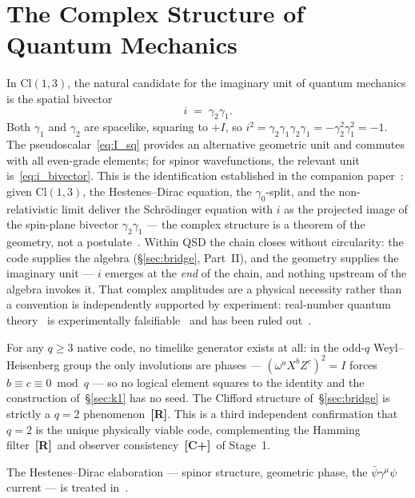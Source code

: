 \documentclass[11pt,a4paper]{article}
\newcommand{\Rmark}{\textcolor{green!50!black}{\textbf{[R]}}}
\newcommand{\Cpmark}{\textcolor{blue!70!black}{\textbf{[C+]}}}
\providecommand{\Cl}[1]{\mathrm{Cl}(#1)}
\begin{document}
\section{The Complex Structure of Quantum Mechanics}
\label{sec:complex}

In $\Cl{1,3}$, the natural candidate for the imaginary unit of quantum mechanics is the spatial bivector
\begin{equation}
  i \;=\; \gamma_2\gamma_1.
  \label{eq:i_bivector}
\end{equation}
Both $\gamma_1$ and $\gamma_2$ are spacelike, squaring to $+I$, so
\(
  i^2 = \gamma_2\gamma_1\gamma_2\gamma_1
       = -\gamma_2^2\gamma_1^2 = -1.
\)
The pseudoscalar~\eqref{eq:I_sq} provides an alternative geometric unit and commutes with all even-grade elements; for spinor wavefunctions, the relevant unit is~\eqref{eq:i_bivector}. This is the identification established in the companion paper~\cite{Hubka2026CW}: given $\Cl{1,3}$, the Hestenes--Dirac equation, the $\gamma_0$-split, and the non-relativistic limit deliver the Schr\"odinger equation with $i$ as the projected image of the spin-plane bivector $\gamma_2\gamma_1$ --- the complex structure is a theorem of the geometry, not a postulate~\cite{Hestenes2003, Hubka2026CW}. Within QSD the chain closes without circularity: the code supplies the algebra (\S\ref{sec:bridge}, Part~II), and the geometry supplies the imaginary unit --- $i$ emerges at the \emph{end} of the chain, and nothing upstream of the algebra invokes it. That complex amplitudes are a physical necessity rather than a convention is independently supported by experiment: real-number quantum theory~\cite{Stueckelberg1960} is experimentally falsifiable~\cite{Renou2021} and has been ruled out~\cite{Chen2022}.

For any $q\geq3$ native code, no timelike generator exists at all: in the odd-$q$ Weyl--Heisenberg group the only involutions are phases --- $(\omega^a X^b Z^c)^2 = I$ forces $b\equiv c\equiv 0 \bmod q$ --- so no logical element squares to the identity and the construction of~\S\ref{sec:k1} has no seed. The Clifford structure of~\S\ref{sec:bridge} is strictly a $q=2$ phenomenon~\Rmark. This is a third independent confirmation that $q=2$ is the unique physically viable code, complementing the Hamming filter~\Rmark\ and observer consistency~\Cpmark\ of Stage~1.

The Hestenes--Dirac elaboration --- spinor structure, geometric phase, the $\bar\psi\gamma^\mu\psi$ current --- is treated in~\cite{Hestenes2003, Hubka2026CW}.
\end{document}
